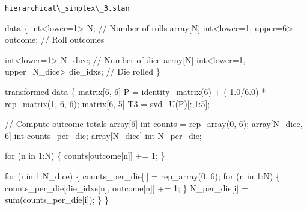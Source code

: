 \documentclass[
  letterpaper,
  DIV=11,
  numbers=noendperiod]{scrartcl}
\newenvironment{Shaded}{\begin{snugshade}}{\end{snugshade}}
\newcommand{\CommentTok}[1]{\textcolor[rgb]{0.37,0.37,0.37}{#1}}
\newcommand{\ControlFlowTok}[1]{\textcolor[rgb]{0.00,0.23,0.31}{#1}}
\newcommand{\DataTypeTok}[1]{\textcolor[rgb]{0.68,0.00,0.00}{#1}}
\newcommand{\DecValTok}[1]{\textcolor[rgb]{0.68,0.00,0.00}{#1}}
\newcommand{\FloatTok}[1]{\textcolor[rgb]{0.68,0.00,0.00}{#1}}
\newcommand{\KeywordTok}[1]{\textcolor[rgb]{0.00,0.23,0.31}{#1}}
\newcommand{\NormalTok}[1]{\textcolor[rgb]{0.00,0.23,0.31}{#1}}
\begin{document}
\begin{codelisting}

\caption{\texttt{hierarchical\textbackslash\_simplex\textbackslash\_3.stan}}

\begin{Shaded}
\begin{Highlighting}[]
\KeywordTok{data}\NormalTok{ \{}
  \DataTypeTok{int}\NormalTok{\textless{}}\KeywordTok{lower}\NormalTok{=}\DecValTok{1}\NormalTok{\textgreater{} N;                         }\CommentTok{// Number of rolls}
  \DataTypeTok{array}\NormalTok{[N] }\DataTypeTok{int}\NormalTok{\textless{}}\KeywordTok{lower}\NormalTok{=}\DecValTok{1}\NormalTok{, }\KeywordTok{upper}\NormalTok{=}\DecValTok{6}\NormalTok{\textgreater{} outcome; }\CommentTok{// Roll outcomes}

  \DataTypeTok{int}\NormalTok{\textless{}}\KeywordTok{lower}\NormalTok{=}\DecValTok{1}\NormalTok{\textgreater{} N\_dice;                          }\CommentTok{// Number of dice}
  \DataTypeTok{array}\NormalTok{[N] }\DataTypeTok{int}\NormalTok{\textless{}}\KeywordTok{lower}\NormalTok{=}\DecValTok{1}\NormalTok{, }\KeywordTok{upper}\NormalTok{=N\_dice\textgreater{} die\_idxs; }\CommentTok{// Die rolled}
\NormalTok{\}}

\KeywordTok{transformed data}\NormalTok{ \{}
  \DataTypeTok{matrix}\NormalTok{[}\DecValTok{6}\NormalTok{, }\DecValTok{6}\NormalTok{] P = identity\_matrix(}\DecValTok{6}\NormalTok{) + ({-}}\FloatTok{1.0}\NormalTok{/}\FloatTok{6.0}\NormalTok{) * rep\_matrix(}\DecValTok{1}\NormalTok{, }\DecValTok{6}\NormalTok{, }\DecValTok{6}\NormalTok{);}
  \DataTypeTok{matrix}\NormalTok{[}\DecValTok{6}\NormalTok{, }\DecValTok{5}\NormalTok{] T3 = svd\_U(P)[:,}\DecValTok{1}\NormalTok{:}\DecValTok{5}\NormalTok{];}

  \CommentTok{// Compute outcome totals}
  \DataTypeTok{array}\NormalTok{[}\DecValTok{6}\NormalTok{] }\DataTypeTok{int}\NormalTok{ counts = rep\_array(}\DecValTok{0}\NormalTok{, }\DecValTok{6}\NormalTok{);}
  \DataTypeTok{array}\NormalTok{[N\_dice, }\DecValTok{6}\NormalTok{] }\DataTypeTok{int}\NormalTok{ counts\_per\_die;}
  \DataTypeTok{array}\NormalTok{[N\_dice] }\DataTypeTok{int}\NormalTok{ N\_per\_die;}

  \ControlFlowTok{for}\NormalTok{ (n }\ControlFlowTok{in} \DecValTok{1}\NormalTok{:N) \{}
\NormalTok{    counts[outcome[n]] += }\DecValTok{1}\NormalTok{;}
\NormalTok{  \}}

  \ControlFlowTok{for}\NormalTok{ (i }\ControlFlowTok{in} \DecValTok{1}\NormalTok{:N\_dice) \{}
\NormalTok{    counts\_per\_die[i] = rep\_array(}\DecValTok{0}\NormalTok{, }\DecValTok{6}\NormalTok{);}
    \ControlFlowTok{for}\NormalTok{ (n }\ControlFlowTok{in} \DecValTok{1}\NormalTok{:N) \{}
\NormalTok{      counts\_per\_die[die\_idxs[n], outcome[n]] += }\DecValTok{1}\NormalTok{;}
\NormalTok{    \}}
\NormalTok{    N\_per\_die[i] = sum(counts\_per\_die[i]);}
\NormalTok{  \}}
\NormalTok{\}}


\end{Highlighting}
\end{Shaded}
\end{codelisting}
\end{document}
